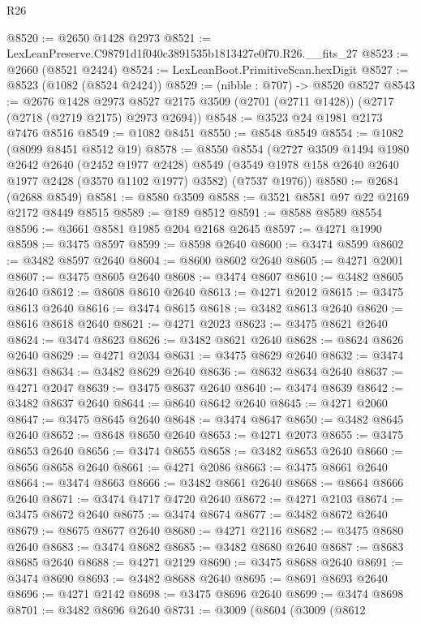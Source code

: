 \begin{lexlean}{R26}
\begin{coremodule}
@8520 := @2650 @1428 @2973
@8521 := LexLeanPreserve.C98791d1f040c3891535b1813427e0f70.R26.__fits_27
@8523 := @2660 (@8521 @2424)
@8524 := LexLeanBoot.PrimitiveScan.hexDigit
@8527 := @8523 (@1082 (@8524 @2424))
@8529 := (nibble : @707) -> @8520 @8527
@8543 := @2676
    @1428
    @2973
    @8527
    @2175
    @3509
    (@2701 (@2711 @1428))
    (@2717 (@2718 (@2719 @2175) @2973 @2694))
@8548 := @3523 @24 @1981 @2173 @7476 @8516
@8549 := @1082 @8451
@8550 := @8548 @8549
@8554 := @1082 (@8099 @8451 @8512 @19)
@8578 := @8550
    @8554
    (@2727
      @3509
      @1494
      @1980
      @2642
      @2640
      (@2452 @1977 @2428)
      @8549
      (@3549 @1978 @158 @2640 @2640 @1977 @2428 (@3570 @1102 @1977) @3582)
      (@7537 @1976))
@8580 := @2684 (@2688 @8549)
@8581 := @8580 @3509
@8588 := @3521 @8581 @97 @22 @2169 @2172 @8449 @8515
@8589 := @189 @8512
@8591 := @8588 @8589 @8554
@8596 := @3661 @8581 @1985 @204 @2168 @2645
@8597 := @4271 @1990
@8598 := @3475 @8597
@8599 := @8598 @2640
@8600 := @3474 @8599
@8602 := @3482 @8597 @2640
@8604 := @8600 @8602 @2640
@8605 := @4271 @2001
@8607 := @3475 @8605 @2640
@8608 := @3474 @8607
@8610 := @3482 @8605 @2640
@8612 := @8608 @8610 @2640
@8613 := @4271 @2012
@8615 := @3475 @8613 @2640
@8616 := @3474 @8615
@8618 := @3482 @8613 @2640
@8620 := @8616 @8618 @2640
@8621 := @4271 @2023
@8623 := @3475 @8621 @2640
@8624 := @3474 @8623
@8626 := @3482 @8621 @2640
@8628 := @8624 @8626 @2640
@8629 := @4271 @2034
@8631 := @3475 @8629 @2640
@8632 := @3474 @8631
@8634 := @3482 @8629 @2640
@8636 := @8632 @8634 @2640
@8637 := @4271 @2047
@8639 := @3475 @8637 @2640
@8640 := @3474 @8639
@8642 := @3482 @8637 @2640
@8644 := @8640 @8642 @2640
@8645 := @4271 @2060
@8647 := @3475 @8645 @2640
@8648 := @3474 @8647
@8650 := @3482 @8645 @2640
@8652 := @8648 @8650 @2640
@8653 := @4271 @2073
@8655 := @3475 @8653 @2640
@8656 := @3474 @8655
@8658 := @3482 @8653 @2640
@8660 := @8656 @8658 @2640
@8661 := @4271 @2086
@8663 := @3475 @8661 @2640
@8664 := @3474 @8663
@8666 := @3482 @8661 @2640
@8668 := @8664 @8666 @2640
@8671 := @3474 @4717 @4720 @2640
@8672 := @4271 @2103
@8674 := @3475 @8672 @2640
@8675 := @3474 @8674
@8677 := @3482 @8672 @2640
@8679 := @8675 @8677 @2640
@8680 := @4271 @2116
@8682 := @3475 @8680 @2640
@8683 := @3474 @8682
@8685 := @3482 @8680 @2640
@8687 := @8683 @8685 @2640
@8688 := @4271 @2129
@8690 := @3475 @8688 @2640
@8691 := @3474 @8690
@8693 := @3482 @8688 @2640
@8695 := @8691 @8693 @2640
@8696 := @4271 @2142
@8698 := @3475 @8696 @2640
@8699 := @3474 @8698
@8701 := @3482 @8696 @2640
@8731 := @3009
    (@8604
      (@3009
        (@8612

\end{coremodule}
\end{lexlean}
